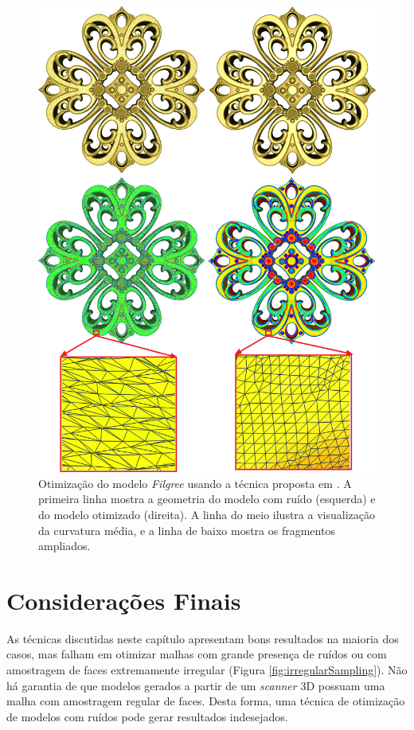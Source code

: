 \begin{figure}[!h]
\captionsetup{width=\linewidth}
\centering
\includegraphics[scale=0.2]{figuras/filtroEregularidade.png}
\caption{Otimização do modelo \textit{Filgree} usando a técnica proposta em \cite{wei2013feature}. A primeira linha mostra a geometria do modelo com ruído (esquerda) e do modelo otimizado (direita). A linha do meio ilustra a visualização da curvatura média, e a linha de baixo mostra os fragmentos ampliados.}
\label{fig:filtroEregularidade}
\end{figure}

\section{Considerações Finais}

As técnicas discutidas neste capítulo apresentam bons resultados na maioria dos casos, mas falham em otimizar malhas com grande presença de ruídos ou com amostragem de faces extremamente irregular (Figura \ref{fig:irregularSampling}). Não há garantia de que modelos gerados a partir de um \textit{scanner} 3D possuam uma malha com amostragem regular de faces. Desta forma, uma técnica de otimização de modelos com ruídos pode gerar resultados indesejados.

